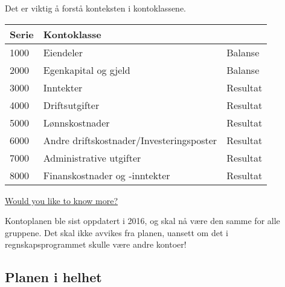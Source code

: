 Det er viktig å forstå konteksten i kontoklassene.
\begin{table}[h]
	\begin{tabular}[c]{l l l}
		Serie & Kontoklasse \\ \hline
		1000 & Eiendeler & Balanse \\
		2000 & Egenkapital og gjeld & Balanse \\
		3000 & Inntekter & Resultat \\
		4000 & Driftsutgifter & Resultat \\
		5000 & Lønnskostnader & Resultat \\
		6000 & Andre driftskostnader/Investeringsposter & Resultat \\
		7000 & Administrative utgifter & Resultat \\
		8000 & Finanskostnader og -inntekter & Resultat \\
	\end{tabular}
\end{table}



\hyperlink{ff-egenkap}{Would you like to know more?}

Kontoplanen ble sist oppdatert i 2016, og skal nå være den samme for alle gruppene.
Det skal ikke avvikes fra planen, uansett om det i regnskapsprogrammet skulle være andre kontoer!
\subsection*{Planen i helhet}


